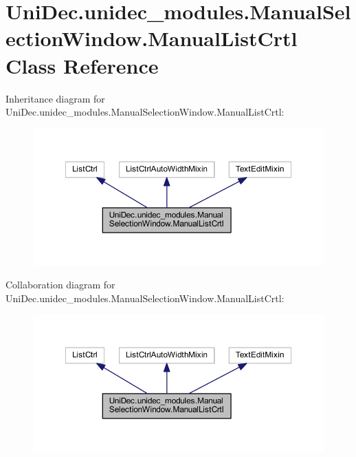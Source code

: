 \hypertarget{class_uni_dec_1_1unidec__modules_1_1_manual_selection_window_1_1_manual_list_crtl}{}\section{Uni\+Dec.\+unidec\+\_\+modules.\+Manual\+Selection\+Window.\+Manual\+List\+Crtl Class Reference}
\label{class_uni_dec_1_1unidec__modules_1_1_manual_selection_window_1_1_manual_list_crtl}


Inheritance diagram for Uni\+Dec.\+unidec\+\_\+modules.\+Manual\+Selection\+Window.\+Manual\+List\+Crtl\+:\nopagebreak
\begin{figure}[H]
\begin{center}
\leavevmode
\includegraphics[width=350pt]{class_uni_dec_1_1unidec__modules_1_1_manual_selection_window_1_1_manual_list_crtl__inherit__graph}
\end{center}
\end{figure}


Collaboration diagram for Uni\+Dec.\+unidec\+\_\+modules.\+Manual\+Selection\+Window.\+Manual\+List\+Crtl\+:\nopagebreak
\begin{figure}[H]
\begin{center}
\leavevmode
\includegraphics[width=350pt]{class_uni_dec_1_1unidec__modules_1_1_manual_selection_window_1_1_manual_list_crtl__coll__graph}
\end{center}
\end{figure}
